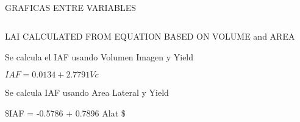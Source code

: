 \documentclass[11pt]{article}
\makeatletter
\newcommand{\boxspacing}{\kern\kvtcb@left@rule\kern\kvtcb@boxsep}
\newcommand{\prompt}[4]{
        {\ttfamily\llap{{\color{#2}[#3]:\hspace{3pt}#4}}\vspace{-\baselineskip}}
    }
\makeatother
\begin{document}
    \begin{center}
    \end{center}
    { \hspace*{\fill} \\}
    
    GRAFICAS ENTRE VARIABLES

    \begin{tcolorbox}[breakable, size=fbox, boxrule=1pt, pad at break*=1mm,colback=cellbackground, colframe=cellborder]
\prompt{In}{incolor}{ }{\boxspacing}
\begin{Verbatim}[commandchars=\\\{\}]

\end{Verbatim}
\end{tcolorbox}

    LAI CALCULATED FROM EQUATION BASED ON VOLUME and AREA

Se calcula el IAF usando Volumen Imagen y Yield

\(IAF = 0.0134 + 2.7791 Vc\)

Se calcula IAF usando Area Lateral y Yield

\$IAF = -0.5786 + 0.7896 Alat \$

    \begin{tcolorbox}[breakable, size=fbox, boxrule=1pt, pad at break*=1mm,colback=cellbackground, colframe=cellborder]
\prompt{In}{incolor}{ }{\boxspacing}
\begin{Verbatim}[commandchars=\\\{\}]

\end{Verbatim}
\end{tcolorbox}
\end{document}
